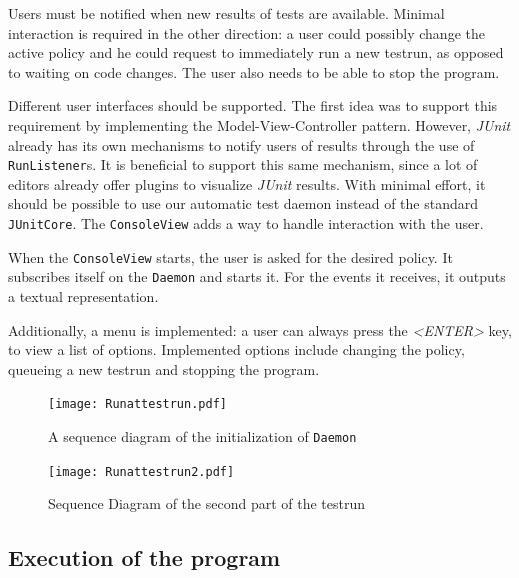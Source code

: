 \documentclass[i2]{oss}
\newcommand{\class}[1]{\texttt{#1}}
\newcommand{\junit}{\emph{JUnit }}
\begin{document}
Users must be notified when new results of tests are available.
Minimal interaction is required in the other direction: a user could possibly change the active policy and he could request to immediately run a new testrun, as opposed to waiting on code changes.
The user also needs to be able to stop the program.

Different user interfaces should be supported.
The first idea was to support this requirement by implementing the Model-View-Controller pattern.
However, \junit already has its own mechanisms to notify users of results through the use of \class{RunListener}s.
It is beneficial to support this same mechanism, since a lot of editors already offer plugins to visualize \junit results.
With minimal effort, it should be possible to use our automatic test daemon instead of the standard \class{JUnitCore}.
The \class{ConsoleView} adds a way to handle interaction with the user.

When the \class{ConsoleView} starts, the user is asked for the desired policy.
It subscribes itself on the \class{Daemon} and starts it.
For the events it receives, it outputs a textual representation.

Additionally, a menu is implemented: a user can always press the \emph{<ENTER>} key, to view a list of options.
Implemented options include changing the policy, queueing a new testrun and stopping the program.

\begin{figure}[tbp]
\begin{center}
    \texttt{[image: Runattestrun.pdf]}
	\caption{A sequence diagram of the initialization of \class{Daemon}}
	\label{fig:daemon:initialize}
\end{center}
\end{figure}

\begin{figure}[tbp]
\begin{center}
    \texttt{[image: Runattestrun2.pdf]}
	\caption{Sequence Diagram of the second part of the testrun}
	\label{fig:daemon:createrequest}
\end{center}
\end{figure}


\subsection{Execution of the program}
\end{document}
